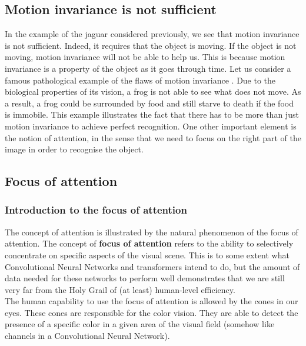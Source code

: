 \documentclass[12pt]{article}
\begin{document}
\subsection{Motion invariance is not sufficient}
In the example of the jaguar considered previously, we see that motion invariance is not sufficient. Indeed, it requires that the object is moving. If the object is not moving, motion invariance will not be able to help us. This is because motion invariance is a property of the object as it goes through time. Let us consider a famous pathological example of the flaws of motion invariance \cite{gori2022}. Due to the biological properties of its vision, a frog is not able to see what does not move. As a result, a frog could be surrounded by food and still starve to death if the food is immobile. This example illustrates the fact that there has to be more than just motion invariance to achieve perfect recognition. One other important element is the notion of attention, in the sense that we need to focus on the right part of the image in order to recognise the object. 

\subsection{Focus of attention}
\subsubsection{Introduction to the focus of attention}
The concept of attention is illustrated by the natural phenomenon of the focus of attention. The concept of \textbf{focus of attention} refers to the ability to selectively concentrate on specific aspects of the visual scene. This is to some extent what Convolutional Neural Networks \cite{lecun1995} and transformers \cite{vaswani2017} intend to do, but the amount of data needed for these networks to perform well demonstrates that we are still very far from the Holy Grail of (at least) human-level efficiency. \\
The human capability to use the focus of attention is allowed by the cones in our eyes. These cones are responsible for the color vision. They are able to detect the presence of a specific color in a given area of the visual field (somehow like channels in a Convolutional Neural Network).
\end{document}
